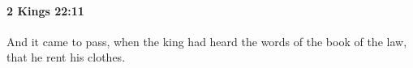 
		\paragraph{2 Kings 22:11} %
			\label{2KINGS-22-11}

			And it came to pass, when the king had heard the words of the book of the law, that he rent his clothes.


